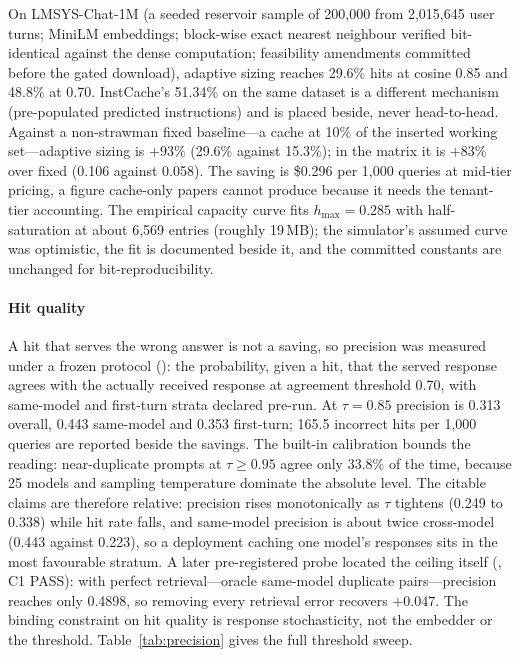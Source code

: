 On LMSYS-Chat-1M \citep{lmsyschat1m2024} (a seeded reservoir sample of
200,000 from 2,015,645 user turns; MiniLM embeddings; block-wise exact
nearest neighbour verified bit-identical against the dense computation;
feasibility amendments committed before the gated download), adaptive
sizing reaches 29.6\% hits at cosine 0.85 and 48.8\% at 0.70. InstCache's
51.34\% on the same dataset \citep{instcache2024} is a different mechanism
(pre-populated predicted instructions) and is placed beside, never
head-to-head. Against a non-strawman fixed baseline---a cache at 10\% of
the inserted working set---adaptive sizing is $+93\%$ (29.6\% against
15.3\%); in the matrix it is $+83\%$ over fixed (0.106 against 0.058). The
saving is \$0.296 per 1,000 queries at mid-tier pricing, a figure
cache-only papers cannot produce because it needs the tenant-tier
accounting. The empirical capacity curve fits $h_{\max} = 0.285$ with
half-saturation at about 6,569 entries (roughly 19\,MB); the simulator's
assumed curve was optimistic, the fit is documented beside it, and the
committed constants are unchanged for bit-reproducibility.

\paragraph{Hit quality} A hit that serves the wrong answer is not a
saving, so precision was measured under a frozen protocol
(): the probability, given a hit, that the
served response agrees with the actually received response at agreement
threshold 0.70, with same-model and first-turn strata declared pre-run. At
$\tau = 0.85$ precision is 0.313 overall, 0.443 same-model and 0.353
first-turn; 165.5 incorrect hits per 1,000 queries are reported beside the
savings. The built-in calibration bounds the reading: near-duplicate
prompts at $\tau \ge 0.95$ agree only 33.8\% of the time, because 25
models and sampling temperature dominate the absolute level. The citable
claims are therefore relative: precision rises monotonically as $\tau$
tightens (0.249 to 0.338) while hit rate falls, and same-model precision
is about twice cross-model (0.443 against 0.223), so a deployment caching
one model's responses sits in the most favourable stratum. A later
pre-registered probe located the ceiling itself
(, C1 PASS): with perfect retrieval---oracle
same-model duplicate pairs---precision reaches only 0.4898, so removing
every retrieval error recovers $+0.047$. The binding constraint on hit
quality is response stochasticity, not the embedder or the threshold.
Table~\ref{tab:precision} gives the full threshold sweep.

